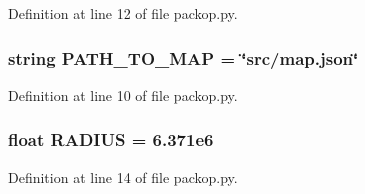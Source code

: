 Definition at line 12 of file packop.\+py.

\subsubsection[{\texorpdfstring{P\+A\+T\+H\+\_\+\+T\+O\+\_\+\+M\+AP}{PATH_TO_MAP}}]{\setlength{\rightskip}{0pt plus 5cm}string P\+A\+T\+H\+\_\+\+T\+O\+\_\+\+M\+AP = \char`\"{}src/map.\+json\char`\"{}}\hypertarget{namespacesrc_1_1packop_ad0b1434232e2f7419383199084141ac0}{}\label{namespacesrc_1_1packop_ad0b1434232e2f7419383199084141ac0}


Definition at line 10 of file packop.\+py.

\subsubsection[{\texorpdfstring{R\+A\+D\+I\+US}{RADIUS}}]{\setlength{\rightskip}{0pt plus 5cm}float R\+A\+D\+I\+US = 6.\+371e6}\hypertarget{namespacesrc_1_1packop_a107fd7168576042ab02c24c419507f1e}{}\label{namespacesrc_1_1packop_a107fd7168576042ab02c24c419507f1e}


Definition at line 14 of file packop.\+py.

